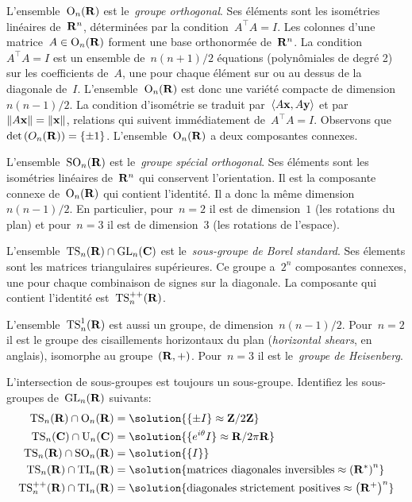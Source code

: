 L'ensemble~$\mathrm{O}_n(\mathbf{R})$ est le~\emph{groupe orthogonal}.
Ses éléments sont les isométries linéaires de~$\mathbf{R}^n$, déterminées par la
condition~$A^\top A=I$.  Les colonnes d'une matrice~$A\in\mathrm{O}_n(\mathbf{R})$ forment
une base orthonormée de~$\mathbf{R}^n$.  La condition~$A^\top A=I$ est un ensemble
de~$n(n+1)/2$ équations (polynômiales de degré 2) sur les coefficients
de~$A$, une pour chaque élément sur ou au dessus de la diagonale de~$I$.
L'ensemble~$\mathrm{O}_n(\mathbf{R})$ est donc une variété compacte de dimension~$n(n-1)/2$.
La condition d'isométrie se traduit par~$\left\langle A\mathbf{x},A\mathbf{y}\right\rangle$ et
par~$\left\|A\mathbf{x}\right\|=\left\|\mathbf{x}\right\|$, relations qui suivent immédiatement de~$A^\top A=I$.
Observons que~$\textrm{det}\left(O_n(\mathbf{R})\right)=\left\{\pm 1\right\}$.
L'ensemble~$\mathrm{O}_n(\mathbf{R})$ a deux composantes connexes.

L'ensemble~$\mathrm{SO}_n(\mathbf{R})$ est le~\emph{groupe spécial orthogonal}.  Ses éléments
sont les isométries linéaires de~$\mathbf{R}^n$ qui conservent l'orientation.  Il est
la composante connexe de~$\mathrm{O}_n(\mathbf{R})$ qui contient l'identité.  Il a donc la
même dimension~$n(n-1)/2$.  En particulier, pour~$n=2$ il est de
dimension~$1$ (les rotations du plan) et pour~$n=3$ il est de dimension~$3$
(les rotations de l'espace).

L'ensemble~$\mathrm{TS}_n(\mathbf{R})\cap\mathrm{GL}_n(\mathbf{C})$ est le~\emph{sous-groupe de Borel
standard}.  Ses élements sont les matrices triangulaires supérieures.  Ce
groupe a~$2^n$ composantes connexes, une pour chaque combinaison de signes
sur la diagonale.  La composante qui contient l'identité est~$\mathrm{TS}_n^{++}(\mathbf{R})$.

L'ensemble~$\mathrm{TS}^1_n(\mathbf{R})$ est aussi un groupe, de dimension~$n(n-1)/2$.
Pour~$n=2$ il est le groupe des cisaillements horizontaux du plan
(\emph{horizontal shears}, en anglais), isomorphe au groupe~$(\mathbf{R},+)$.
Pour~$n=3$ il est le~\emph{groupe de Heisenberg}.

\begin{exercice}
	L'intersection de sous-groupes est toujours un sous-groupe.  Identifiez
	les sous-groupes de~$\mathrm{GL}_n(\mathbf{R})$ suivants:
	\begin{align*}
		\TS_n(\R) \cap \OO_n(\R) &= \solution{\{\pm I\} \approx \Z/2\Z}\\
		\TS_n(\C) \cap \UU_n(\C) &= \solution{\{e^{i\theta} I\} \approx \R/2\pi\R}\\
		\TS_n(\R) \cap \SO_n(\R) &= \solution{\{I\}} \\
		\TS_n(\R) \cap \TI_n(\R) &= \solution{\textrm{matrices diagonales
		inversibles} \approx \parens{\R^*}^n}\\
		\TS^{++}_n(\R) \cap \TI_n(\R) &= \solution{\textrm{diagonales strictement
		positives} \approx \parens{\R^+}^n}\\
	\end{align*}
\end{exercice}

